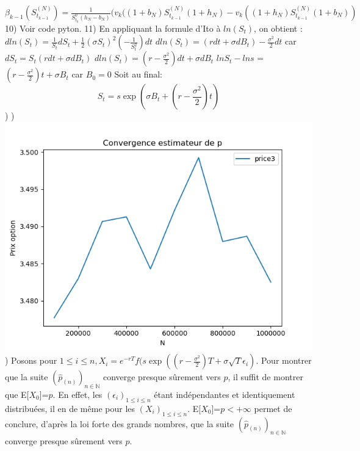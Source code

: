 \documentclass{exam}
\begin{document}
$\beta_{k-1}(S_{t_{k-1}}^{(N)})=\frac{1}{S_{t_k}^0(h_N-b_N)}(v_k((1+b_N)S_{t_{k-1}}^{(N)}(1+h_N)-v_k((1+h_N)S_{t_{k-1}}^{(N)}(1+b_N))$
\newline
\vspace{0.5cm}
10) Voir code pyton.
\newline
\vspace{0.5cm}
11) En appliquant la formule d'Ito à $ln (S_t)$, on obtient :
\newline
\espace
$dln(S_t)=\frac{1}{S_t}dS_t + \frac{1}{2}(\sigma S_t)^{2}(-\frac{1}{S_t^{2}})dt$  
\newline
\espace
\Longleftrightarrow \hspace{0.5cm} $dln(S_t)=(r dt + \sigma dB_t)-\frac{\sigma^{2}}{2} dt$ \hspace{0.5cm} car \hspace{0.5cm} $dS_t=S_t(rdt + \sigma dB_t)$
\newline
\espace
\Longleftrightarrow \hspace{0.5cm} $dln(S_t)=(r-\frac{\sigma^2}{2})dt + \sigma dB_t$
\newline
\espace
\Longleftrightarrow \hspace{0.5cm} $lnS_t - lns$ = $(r-\frac{\sigma^2}{2})t + \sigma B_t$ \hspace{0.5cm} car $B_0=0$
\newline
\espace
Soit au final:
\newline
\espace
$$\boxed{S_t=s \exp{(\sigma B_t + (r-\frac{\sigma^2}{2})t)}}$$
\newline
{})
\newline
{}) \includegraphics{question13.png}
\newline
{}) Posons pour $1 \leq i \leq n, X_i = e^{-rT}f(s \exp ((r-\frac{\sigma^2}{2})T + \sigma \sqrt{T} \epsilon_i)$. Pour montrer que la suite $(\hat{p}_{(n)})_{n \in \mathbb{N}}$ converge presque sûrement vers $p$, il suffit de montrer que E[$X_0$]=$p$. En effet, les $(\epsilon_i)_{1 \leq i \leq n}$ étant indépendantes et identiquement distribuées, il en de même pour les $(X_i)_{1 \leq i \leq n}$. E[$X_0$]=$p < +\infty$ permet de conclure, d'après la loi forte des grands nombres, que la suite $(\hat{p}_{(n)})_{n \in \mathbb{N}}$ converge presque sûrement vers $p$. 
\end{document}

